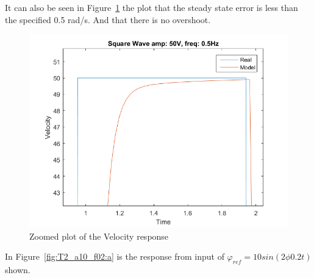 \documentclass[12pt,a4paper]{article}
\begin{document}
 It can also be seen in
Figure~\ref{fig:T2_a50_f05_ss} the plot that the
steady state error is less than the specified 0.5 rad/s. And that there
is no overshoot.
\begin{figure}[H]
    \centering
    \includegraphics[width=0.45\linewidth]{T2_a50_f05_ss.png}
    \caption{Zoomed plot of the Velocity response}
    \label{fig:T2_a50_f05_ss}
\end{figure}
In Figure~\ref{fig:T2_a10_f02:a} is the response from input of
$\varphi_{ref}=10sin(2\phi 0.2t)$ shown.
\end{document}
